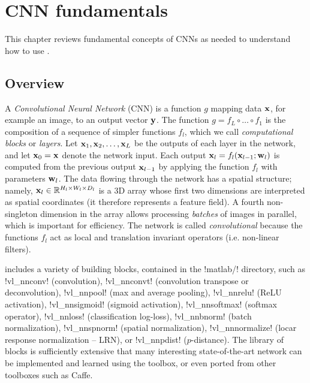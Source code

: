 \chapter{CNN fundamentals}\label{s:fundamentals}

This chapter reviews fundamental concepts of CNNs as needed to understand how to use \matconvnet.

\section{Overview}\label{s:cnn-structure}

A \emph{Convolutional Neural Network} (CNN) is a function $g$ mapping data $\mathbf{x}$, for example an image, to an output vector $\mathbf{y}$. The function $g=f_L \circ \dots \circ f_1$ is the composition of a sequence of simpler functions $f_l$, which we  call \emph{computational blocks} or \emph{layers}.  Let $\mathbf{x}_1,\mathbf{x}_2,\dots,\mathbf{x}_L$ be the outputs of each layer in the network, and let $\mathbf{x}_0=\mathbf{x}$ denote the network input. Each output $\mathbf{x}_l = f_l(\mathbf{x}_{l-1};\mathbf{w}_l)$ is computed from the previous output $\mathbf{x}_{l-1}$  by applying the function $f_l$ with parameters $\mathbf{w}_l$. The data flowing through the network has a spatial structure; namely,  $\mathbf{x}_l\in\mathbb{R}^{H_l \times W_l \times D_l}$ is a 3D array whose first two dimensions are interpreted as spatial coordinates (it therefore represents a feature field).  A fourth non-singleton dimension in the array allows processing \emph{batches} of images in parallel, which is important for efficiency. The network is called \emph{convolutional} because the functions $f_l$ act as local and translation invariant operators (i.e. non-linear filters). 

\matlab includes a variety of  building blocks, contained in the !matlab/! directory, such as !vl_nnconv! (convolution), !vl_nnconvt! (convolution transpose or deconvolution), !vl_nnpool! (max and average pooling), !vl_nnrelu! (ReLU activation), !vl_nnsigmoid! (sigmoid activation), !vl_nnsoftmax! (softmax operator), !vl_nnloss! (classification log-loss), !vl_nnbnorm! (batch normalization), !vl_nnspnorm! (spatial normalization), !vl_nnnormalize! (locar response normalization -- LRN), or !vl_nnpdist! ($p$-distance).  The library of blocks is sufficiently extensive that many interesting state-of-the-art network can be implemented and learned using the toolbox, or even ported from other toolboxes such as Caffe.

